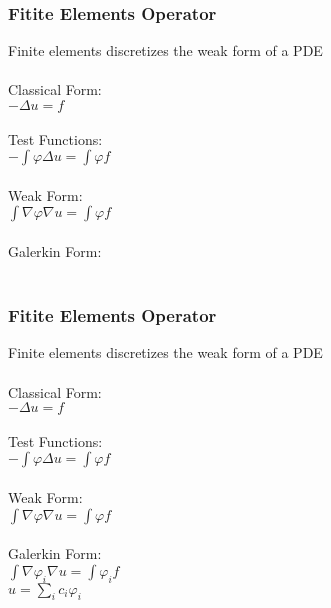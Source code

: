 \documentclass{beamer}
\begin{document}

\begin{frame}
\begin{center}
\frametitle{Fitite Elements Operator}

Finite elements discretizes the weak form of a PDE\\

~\\

Classical Form:\\
$- \Delta u = f$\\

~\\

Test Functions:\\
$- \int \varphi \Delta u = \int \varphi f$\\

~\\

Weak Form:\\
$\int \nabla \varphi \nabla u = \int \varphi f$\\

~\\

Galerkin Form:\\
~

\end{center}
\end{frame}


\begin{frame}
\begin{center}
\frametitle{Fitite Elements Operator}

Finite elements discretizes the weak form of a PDE\\

~\\

Classical Form:\\
$- \Delta u = f$\\

~\\

Test Functions:\\
$- \int \varphi \Delta u = \int \varphi f$\\

~\\

Weak Form:\\
$\int \nabla \varphi \nabla u = \int \varphi f$\\

~\\

Galerkin Form:\\
$\int \nabla \varphi_i \nabla u = \int \varphi_i f$\\

$u = \sum_i c_i \varphi_i$

\end{center}
\end{frame}
\end{document}
